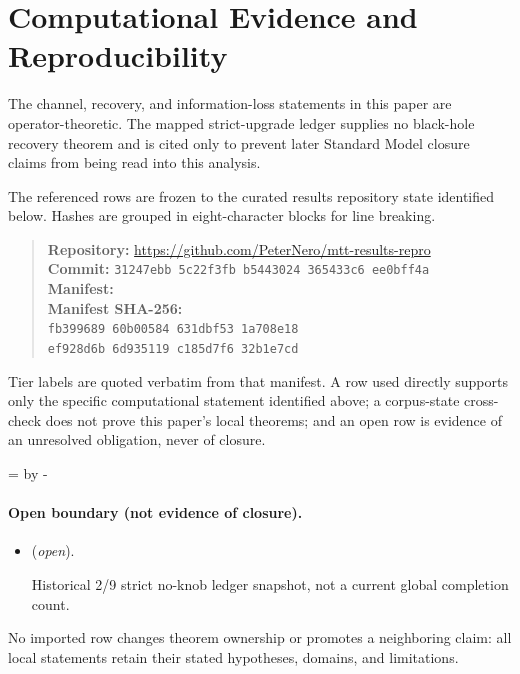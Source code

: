 \documentclass[11pt]{article}
\begin{document}
\section*{Computational Evidence and Reproducibility}
The channel, recovery, and information-loss statements in this paper are operator-theoretic. The mapped strict-upgrade ledger supplies no black-hole recovery theorem and is cited only to prevent later Standard Model closure claims from being read into this analysis.

The referenced rows are frozen to the curated results repository state identified below. Hashes are grouped in eight-character blocks for line breaking.
\begin{quote}\small
\textbf{Repository:} \url{https://github.com/PeterNero/mtt-results-repro}\\
\textbf{Commit:} \texttt{31247ebb 5c22f3fb b5443024 365433c6 ee0bff4a}\\
\textbf{Manifest:} \\
\textbf{Manifest SHA-256:}\\
\texttt{fb399689 60b00584 631dbf53 1a708e18}\\
\texttt{ef928d6b 6d935119 c185d7f6 32b1e7cd}
\end{quote}

Tier labels are quoted verbatim from that manifest. A row used directly supports only the specific computational statement identified above; a corpus-state cross-check does not prove this paper's local theorems; and an open row is evidence of an unresolved obligation, never of closure.

\par\begingroup{}=\pagegoal\advance{} by -\pagetotal\ifdim\dimen0<7\baselineskip\newpage\fi\endgroup
\paragraph{Open boundary (not evidence of closure).}
\begin{itemize}
\setlength{\itemsep}{0.25em}
\item {} (\emph{open}).\par Historical 2/9
strict no-knob ledger snapshot, not a current global completion count.
\end{itemize}

No imported row changes theorem ownership or promotes a neighboring claim: all local statements retain their stated hypotheses, domains, and limitations.
\end{document}
